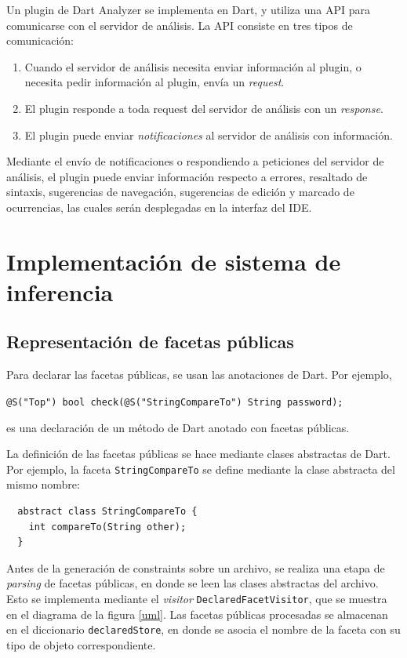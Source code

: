 Un plugin de Dart Analyzer se implementa en Dart, y utiliza una API para comunicarse con el servidor de análisis. La API consiste en tres tipos de comunicación:

\begin{enumerate}
  \item Cuando el servidor de análisis necesita enviar información al plugin, o necesita pedir información al plugin, envía un \emph{request}.
  \item El plugin responde a toda request del servidor de análisis con un \emph{response}.
  \item El plugin puede enviar \emph{notificaciones} al servidor de análisis con información.
\end{enumerate}

Mediante el envío de notificaciones o respondiendo a peticiones del servidor de análisis, el plugin puede enviar información respecto a errores, resaltado de sintaxis, sugerencias de navegación, sugerencias de edición y marcado de ocurrencias, las cuales serán desplegadas en la interfaz del IDE.

\section{Implementación de sistema de inferencia}

\subsection{Representación de facetas públicas}
Para declarar las facetas públicas, se usan las anotaciones de Dart. Por ejemplo,

 \texttt{@S("Top") bool check(@S("StringCompareTo") String password);}

 es una declaración de un método de Dart anotado con facetas públicas.

La definición de las facetas públicas se hace mediante clases abstractas de Dart. Por ejemplo, la faceta \texttt{StringCompareTo} se define mediante la clase abstracta del mismo nombre:

\begin{lstlisting}
  abstract class StringCompareTo {
    int compareTo(String other);
  }
\end{lstlisting}

Antes de la generación de constraints sobre un archivo, se realiza una etapa de \textit{parsing} de facetas públicas, en donde se leen las clases abstractas del archivo. Esto se implementa mediante el \emph{visitor} \texttt{DeclaredFacetVisitor}, que se muestra en el diagrama de la figura \ref{uml}. Las facetas públicas procesadas se almacenan en el diccionario \texttt{declaredStore}, en donde se asocia el nombre de la faceta con su tipo de objeto correspondiente.

